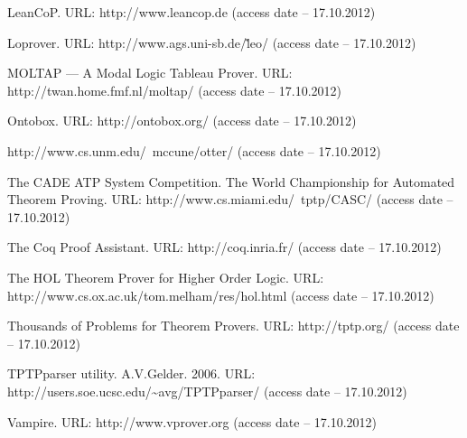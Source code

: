 \begin{thebibliography}{99}
 LeanCoP. URL: http://www.leancop.de (access date -- 17.10.2012)

 Loprover. URL: http://www.ags.uni-sb.de/\~leo/ (access date -- 17.10.2012)

 MOLTAP — A Modal Logic Tableau Prover. URL: http://twan.home.fmf.nl/moltap/ (access date -- 17.10.2012)

 Ontobox. URL: http://ontobox.org/ (access date -- 17.10.2012)

 http://www.cs.unm.edu/~mccune/otter/ (access date -- 17.10.2012)

 The CADE ATP System Competition. The World Championship for Automated Theorem Proving. URL: http://www.cs.miami.edu/~tptp/CASC/ (access date -- 17.10.2012)

 The Coq Proof Assistant. URL: http://coq.inria.fr/ (access date -- 17.10.2012)

 The HOL Theorem Prover for Higher Order Logic. URL: http://www.cs.ox.ac.uk/tom.melham/res/hol.html (access date -- 17.10.2012)

 Thousands of Problems for Theorem Provers. URL: http://tptp.org/ (access date -- 17.10.2012)

 TPTPparser utility. A.V.Gelder. 2006. URL: http://users.soe.ucsc.edu/\~{}avg/TPTPparser/ (access date -- 17.10.2012)

 Vampire. URL: http://www.vprover.org (access date -- 17.10.2012)








\end{thebibliography}



